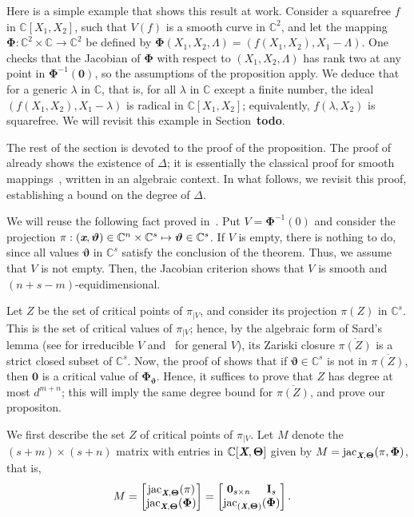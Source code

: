 \documentclass[sigconf]{acmart}
\def\td{{\bf todo}}
\def\Xb{\textit{\textbf{X}}}
\def\Thetab{\bm{\Theta}}
\def\thetab{\bm{\vartheta}}
\def\xb{\textit{\textbf{x}}}
\def\C{\mathbb{C}}
\def\jac{ \textrm{jac}}
\def\dt{s}
\def\bbm{\begin{bmatrix}}
\def\ebm{\end{bmatrix}}
\begin{document}
Here is a simple example that shows this result at work. Consider a
squarefree $f$ in $\C[X_1,X_2]$, such that $V(f)$ is a smooth curve in
$\C^2$, and let the mapping $\bm\Phi:\C^2\times \C \to \C^2$ be defined
by $\bm\Phi(X_1,X_2,\Lambda) = (f(X_1,X_2), X_1-\Lambda)$. One checks
that the Jacobian of $\bm\Phi$ with respect to $(X_1,X_2,\Lambda)$ has
rank two at any point in $\bm\Phi^{-1}(\bm 0)$, so the assumptions of the
proposition apply. We deduce that for a generic $\lambda$ in $\C$,
that is, for all $\lambda$ in $\C$ except a finite number, the ideal
$(f(X_1,X_2), X_1-\lambda)$ is radical in $\C[X_1,X_2]$; equivalently,
$f(\lambda, X_2)$ is squarefree. We will revisit this example in
Section~\td.

The rest of the section is devoted to the proof of the proposition.
The proof of \cite[Theorem B.3]{TWT} already shows the existence of
$\Delta$; it is essentially the classical proof for smooth
mappings~\cite[Section~3.7]{demazure2000bifurcations}, written in an
algebraic context. In what follows, we revisit this proof,
establishing a bound on the degree of $\Delta$.

We will reuse the following fact proved in~\cite{TWT}.  Put $V =
\bm\Phi^{-1}(0)$ and consider the projection $\pi:(\xb, \thetab) \in
\C^n \times \C^{\dt} \mapsto \thetab \in\C^{\dt}$.  If $V$ is empty,
there is nothing to do, since all values $\thetab$ in $\C^\dt$ satisfy
the conclusion of the theorem. Thus, we assume that $V$ is not
empty. Then, the Jacobian criterion shows that $V$ is
smooth and $(n+ \dt -m)$-equidimensional.

Let $Z$ be the set of critical points of $\pi_{|V}$, and consider its
projection $\pi(Z)$ in $\C^s$. This is the set of critical values of
$\pi_{|V}$; hence, by the algebraic form of Sard's lemma (see
\cite[Theorem~3.7]{Mumford76} for irreducible $V$
and~\cite[Proposition~B.2]{TWT} for general $V$), its Zariski closure
$\overline{\pi(Z)}$ is a strict closed subset of $\C^s$. Now, the
proof of \cite[Theorem B.3]{TWT} shows that if $\thetab \in \C^{\dt}$
is not in $\overline{\pi(Z)}$, then $\bm 0$ is a critical value of
$\bm\Phi_{\thetab}$. Hence, it suffices to prove that $Z$ has degree
at most $d^{m+n}$; this will imply the same degree bound for
$\overline{\pi(Z)}$, and prove our propositon.


We first describe the set $Z$ of critical points of $\pi_{|V}$.  Let
$M$ denote the $(s+m) \times (s+n)$ matrix with entries in
$\C[\Xb,\Thetab]$ given by $M = \jac_{\Xb,\Thetab}(\pi,\bm\Phi)$, that
is,
\begin{align*}
M &= 
\bbm 
\jac_{\Xb,\Thetab}(\pi)\\
\jac_{\Xb,\Thetab}(\bm\Phi) 
\ebm 
=
\bbm 
\textbf{0}_{\dt \times n}\hspace{5mm}\textbf{I}_{\dt} \\
\jac_{(\Xb,\Thetab)}(\bm\Phi)
\ebm.
\end{align*}
\end{document}
